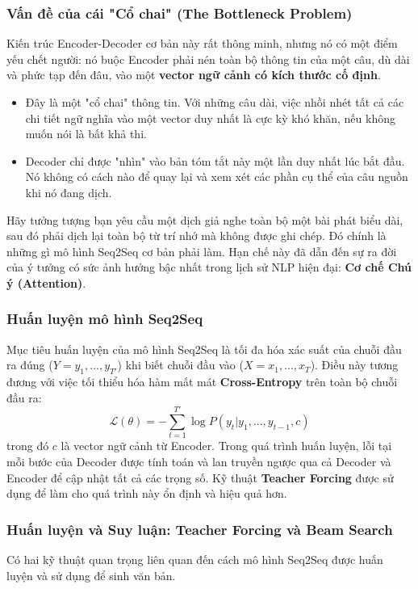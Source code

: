 \subsubsection{Vấn đề của cái "Cổ chai" (The Bottleneck Problem)}
Kiến trúc Encoder-Decoder cơ bản này rất thông minh, nhưng nó có một điểm yếu chết người: nó buộc Encoder phải nén toàn bộ thông tin của một câu, dù dài và phức tạp đến đâu, vào một \textbf{vector ngữ cảnh có kích thước cố định}.
\begin{itemize}
    \item Đây là một "cổ chai" thông tin. Với những câu dài, việc nhồi nhét tất cả các chi tiết ngữ nghĩa vào một vector duy nhất là cực kỳ khó khăn, nếu không muốn nói là bất khả thi.
    \item Decoder chỉ được "nhìn" vào bản tóm tắt này một lần duy nhất lúc bắt đầu. Nó không có cách nào để quay lại và xem xét các phần cụ thể của câu nguồn khi nó đang dịch.
\end{itemize}
Hãy tưởng tượng bạn yêu cầu một dịch giả nghe toàn bộ một bài phát biểu dài, sau đó phải dịch lại toàn bộ từ trí nhớ mà không được ghi chép. Đó chính là những gì mô hình Seq2Seq cơ bản phải làm. Hạn chế này đã dẫn đến sự ra đời của ý tưởng có sức ảnh hưởng bậc nhất trong lịch sử NLP hiện đại: \textbf{Cơ chế Chú ý (Attention)}.

\subsubsection{Huấn luyện mô hình Seq2Seq}
Mục tiêu huấn luyện của mô hình Seq2Seq là tối đa hóa xác suất của chuỗi đầu ra đúng ($Y = y_1, ..., y_{T'}$) khi biết chuỗi đầu vào ($X = x_1, ..., x_T$). Điều này tương đương với việc tối thiểu hóa hàm mất mát \textbf{Cross-Entropy} trên toàn bộ chuỗi đầu ra:
$$ \mathcal{L}(\theta) = - \sum_{t=1}^{T'} \log P(y_t | y_1, ..., y_{t-1}, c) $$
trong đó $c$ là vector ngữ cảnh từ Encoder. Trong quá trình huấn luyện, lỗi tại mỗi bước của Decoder được tính toán và lan truyền ngược qua cả Decoder và Encoder để cập nhật tất cả các trọng số. Kỹ thuật \textbf{Teacher Forcing} được sử dụng để làm cho quá trình này ổn định và hiệu quả hơn.

\subsubsection{Huấn luyện và Suy luận: Teacher Forcing và Beam Search}
Có hai kỹ thuật quan trọng liên quan đến cách mô hình Seq2Seq được huấn luyện và sử dụng để sinh văn bản.

